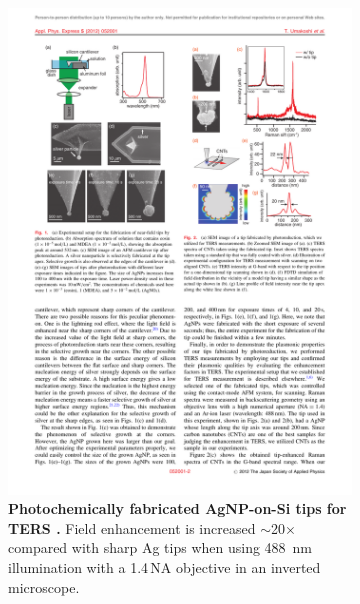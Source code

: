 \documentclass{article}
\begin{document}
\begin{figure}[bt]
\centering
\begin{subfigure}[t]{0.35\textwidth}
	\includegraphics[width=\textwidth, clip=true, trim=0 0 0 130]{figures/literature/umakoshi2012a}
	\caption[Photochemically fabricated AgNP-on-Si tips for TERS \cite{umakoshi2012}]{\textbf{Photochemically fabricated AgNP-on-Si tips for TERS \cite{umakoshi2012}.} Field enhancement is increased $\sim$20$\times$ compared with sharp Ag tips when using \SI{488}{nm} illumination with a 1.4\,NA objective in an inverted microscope.}
\end{subfigure}
~
\begin{subfigure}[t]{0.6\textwidth}

\end{subfigure}
\end{figure}
\end{document}
